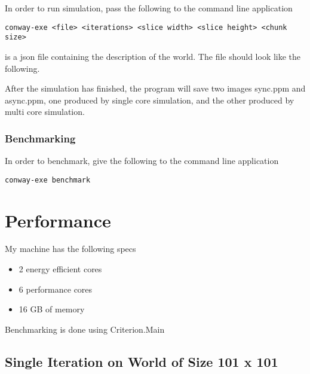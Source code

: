\documentclass{article}
\newcommand{\code}[1]{{\ttfamily #1}}
\begin{document}
        In order to run simulation, pass the following to the command line application

        \begin{lstlisting}
conway-exe <file> <iterations> <slice width> <slice height> <chunk size>
        \end{lstlisting}

         is a json file containing the description of the world. The
        file should look like the following.

        

        After the simulation has finished, the program will save two
        images \code{sync.ppm} and \code{async.ppm}, one produced by
        single core simulation, and the other produced by multi core simulation.

      \subsubsection{Benchmarking}

        In order to benchmark, give the following to the command line application

        \begin{lstlisting}
conway-exe benchmark
        \end{lstlisting}

  \section{Performance}

    My machine has the following specs

    \begin{itemize}
      \item 2 energy efficient cores
      \item 6 performance cores
      \item 16 GB of memory
    \end{itemize}

    Benchmarking is done using \code{Criterion.Main}

    \subsection{Single Iteration on World of Size 101 x 101}

      \begin{figure}[H]
        \centering
      \end{figure}
\end{document}
